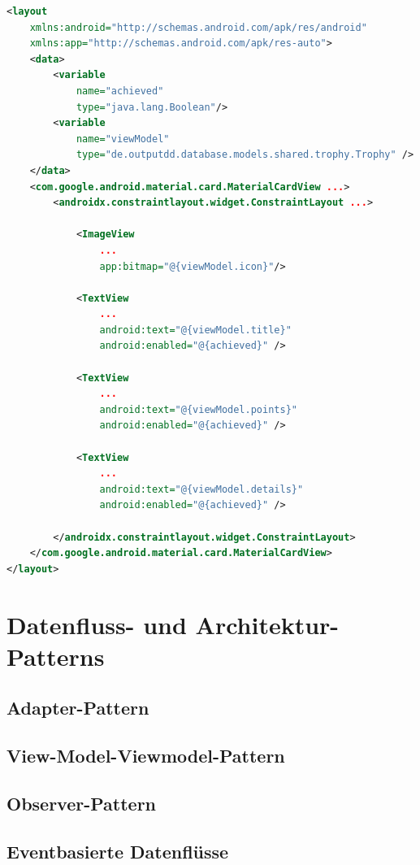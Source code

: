 \begin{lstlisting}[language=XML, caption={Databinding am Beispiel einer Trophäe in der Spielansicht.}, label={lst:databinding}]
<layout 
    xmlns:android="http://schemas.android.com/apk/res/android"
    xmlns:app="http://schemas.android.com/apk/res-auto">
    <data>
        <variable
            name="achieved"
            type="java.lang.Boolean"/>
        <variable
            name="viewModel"
            type="de.outputdd.database.models.shared.trophy.Trophy" />
    </data>
    <com.google.android.material.card.MaterialCardView ...>
        <androidx.constraintlayout.widget.ConstraintLayout ...>

            <ImageView 
                ... 
                app:bitmap="@{viewModel.icon}"/>

            <TextView
                ...
                android:text="@{viewModel.title}"
                android:enabled="@{achieved}" />

            <TextView
                ...
                android:text="@{viewModel.points}"
                android:enabled="@{achieved}" />

            <TextView
                ...
                android:text="@{viewModel.details}"
                android:enabled="@{achieved}" />

        </androidx.constraintlayout.widget.ConstraintLayout>
    </com.google.android.material.card.MaterialCardView>
</layout>
\end{lstlisting}

\section{Datenfluss- und Architektur-Patterns}

\subsection{Adapter-Pattern}

\subsection{View-Model-Viewmodel-Pattern}

\subsection{Observer-Pattern}

\subsection{Eventbasierte Datenflüsse}